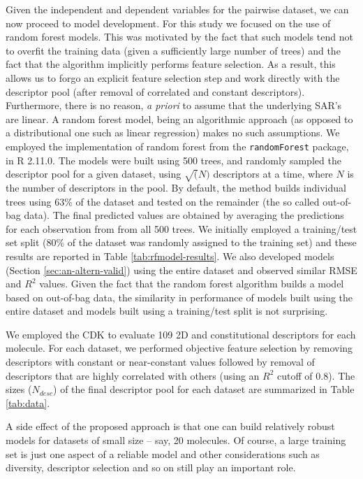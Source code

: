 \documentclass[letterpaper, 12pt]{article}
\begin{document}
Given the independent and dependent variables for the pairwise dataset, we can now proceed to model
development. For this study we focused on the use of random forest models\cite{Breiman:1984aa}. This
was motivated by the fact that such models tend not to overfit the training data (given a
sufficiently large number of trees) and the fact that the algorithm implicitly performs feature
selection. As a result, this allows us to forgo an explicit feature selection step and work directly
with the descriptor pool (after removal of correlated and constant descriptors). Furthermore, there
is no reason, \emph{a priori} to assume that the underlying SAR's are linear. A random forest model,
being an algorithmic approach\cite{Breiman:2001nx} (as opposed to a distributional one such as
linear regression) makes no such assumptions. We employed the implementation of random forest from
the \texttt{randomForest} package, in R 2.11.0\cite{r}. The models were built using 500 trees, and
randomly sampled the descriptor pool for a given dataset, using $\sqrt(N)$ descriptors at a time,
where $N$ is the number of descriptors in the pool. By default, the method builds individual trees
using 63\% of the dataset and tested on the remainder (the so called out-of-bag data). The final
predicted values are obtained by averaging the predictions for each observation from from all 500
trees. We initially employed a training/test set split (80\% of the dataset was randomly assigned to
the training set) and these results are reported in Table \ref{tab:rfmodel-results}. We also
developed models (Section \ref{sec:an-altern-valid}) using the entire dataset and observed similar
RMSE and $R^2$ values. Given the fact that the random forest algorithm builds a model based on
out-of-bag data, the similarity in performance of models built using the entire dataset and models
built using a training/test split is not surprising.

We employed the CDK to evaluate 109 2D and constitutional descriptors for each  molecule. For each
dataset, we performed objective feature selection by removing descriptors with constant or
near-constant values followed by removal of descriptors that are highly correlated with others
(using an $R^2$ cutoff of 0.8). The sizes ($N_{desc}$) of the final descriptor pool for each dataset
are summarized in Table \ref{tab:data}.

A side effect of the proposed approach is that one can build relatively robust models for datasets of
small size -- say, 20 molecules. Of course, a large training set is just one aspect of a reliable
model and other considerations such as diversity, descriptor selection and so on still play an
important role.
\end{document}
